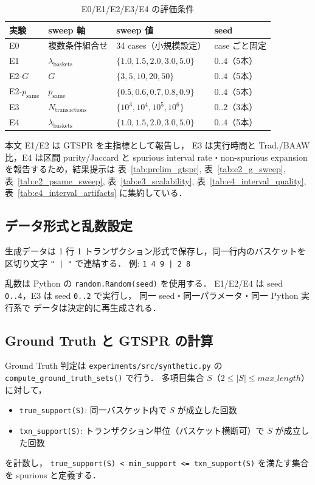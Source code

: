 \begin{table}[t]
\caption{E0/E1/E2/E3/E4 の評価条件}
\label{tab:supp_sweep}
\centering
\begin{tabular}{llll}
\toprule
実験 & sweep 軸 & sweep 値 & seed \\
\midrule
E0 & 複数条件組合せ & 34 cases（小規模設定） & case ごと固定 \\
E1 & $\lambda_{\text{baskets}}$ & $\{1.0, 1.5, 2.0, 3.0, 5.0\}$ & $0..4$（5本） \\
E2-$G$ & $G$ & $\{3, 5, 10, 20, 50\}$ & $0..4$（5本） \\
E2-$p_{\text{same}}$ & $p_{\text{same}}$ & $\{0.5, 0.6, 0.7, 0.8, 0.9\}$ & $0..4$（5本） \\
E3 & $N_{\text{transactions}}$ & $\{10^3,10^4,10^5,10^6\}$ & $0..2$（3本） \\
E4 & $\lambda_{\text{baskets}}$ & $\{1.0, 1.5, 2.0, 3.0, 5.0\}$ & $0..4$（5本） \\
\bottomrule
\end{tabular}
\end{table}

本文 E1/E2 は GTSPR を主指標として報告し，
E3 は実行時間と Trad./BAAW 比，E4 は区間 purity/Jaccard と
spurious interval rate・non-spurious expansion を報告するため，結果提示は
表~\ref{tab:prelim_gtspr}, 表~\ref{tab:e2_g_sweep}, 表~\ref{tab:e2_psame_sweep}, 表~\ref{tab:e3_scalability}, 表~\ref{tab:e4_interval_quality}, 表~\ref{tab:e4_interval_artifacts}
に集約している．

\subsection{データ形式と乱数設定}
\label{sec:supp_data_format}

生成データは 1 行 1 トランザクション形式で保存し，同一行内のバスケットを
区切り文字 \texttt{" | "} で連結する．
例: \texttt{1 4 9 | 2 8}

乱数は Python の \texttt{random.Random(seed)} を使用する．
E1/E2/E4 は seed \texttt{0..4}，E3 は seed \texttt{0..2} で実行し，
同一 seed・同一パラメータ・同一 Python 実行系で
データは決定的に再生成される．

\subsection{Ground Truth と GTSPR の計算}
\label{sec:supp_gt}

Ground Truth 判定は \texttt{experiments/src/synthetic.py} の
\texttt{compute\_ground\_truth\_sets()} で行う．
多項目集合 $S$（$2 \leq |S| \leq max\_length$）に対して，
\begin{itemize}
    \item \texttt{true\_support(S)}: 同一バスケット内で $S$ が成立した回数
    \item \texttt{txn\_support(S)}: トランザクション単位（バスケット横断可）で $S$ が成立した回数
\end{itemize}
を計数し，
\texttt{true\_support(S) < min\_support <= txn\_support(S)}
を満たす集合を spurious と定義する．

